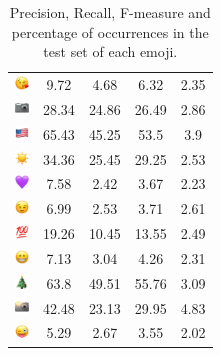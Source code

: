 \documentclass{article}
\begin{document}
\begin{table}
\begin{tabular}{|c|ccc|c|}
\includegraphics[height=0.37cm,width=0.37cm]{img/face_blowing_a_kiss.png} & 9.72 & 4.68 & 6.32 & 2.35\\ 
\includegraphics[height=0.37cm,width=0.37cm]{img/camera.png} & 28.34 & 24.86 & 26.49 & 2.86\\ 
\includegraphics[height=0.37cm,width=0.37cm]{img/United_States.png} & 65.43 & 45.25 & 53.5 & 3.9\\ 
\includegraphics[height=0.37cm,width=0.37cm]{img/sun.png} & 34.36 & 25.45 & 29.25 & 2.53\\ 
\includegraphics[height=0.37cm,width=0.37cm]{img/purple_heart.png} & 7.58 & 2.42 & 3.67 & 2.23\\ 
\includegraphics[height=0.37cm,width=0.37cm]{img/winking_face.png} & 6.99 & 2.53 & 3.71 & 2.61\\ 
\includegraphics[height=0.37cm,width=0.37cm]{img/hundred_points.png} & 19.26 & 10.45 & 13.55 & 2.49\\ 
\includegraphics[height=0.37cm,width=0.37cm]{img/beaming_face_with_smiling_eyes.png} & 7.13 & 3.04 & 4.26 & 2.31\\ 
\includegraphics[height=0.37cm,width=0.37cm]{img/Christmas_tree.png} & 63.8 & 49.51 & 55.76 & 3.09\\ 
\includegraphics[height=0.37cm,width=0.37cm]{img/camera_with_flash.png} & 42.48 & 23.13 & 29.95 & 4.83\\ 
\includegraphics[height=0.37cm,width=0.37cm]{img/winking_face_with_tongue.png} & 5.29 & 2.67 & 3.55 & 2.02\\ 

\hline
\end{tabular}
\caption{\label{table:emoji_detailed} Precision, Recall, F-measure and percentage of occurrences in the test set of each emoji.}
\end{table}
\end{document}
